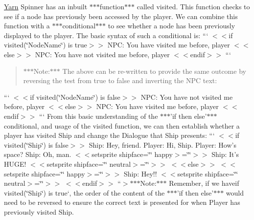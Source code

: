 \hyperlink{a00051}{Yarn} Spinner has an inbuilt $\ast$$\ast$$\ast$function$\ast$$\ast$$\ast$ called {\ttfamily visited}. This function checks to see if a node has previously been accessed by the player. We can combine this function with a $\ast$$\ast$$\ast$conditional$\ast$$\ast$$\ast$ to see whether a node has been previously displayed to the player. The basic syntax of such a conditional is\-: ``` $<$$<$if visited(\char`\"{}\-Node\-Name\char`\"{}) is true$>$$>$ N\-P\-C\-: You have visited me before, player $<$$<$else$>$$>$ N\-P\-C\-: You have not visited me before, player $<$$<$endif$>$$>$ ``` \begin{quotation}
$\ast$$\ast$$\ast$\-Note\-:$\ast$$\ast$$\ast$ The above can be re-\/written to provide the same outcome by reversing the test from true to false and inverting the N\-P\-C text\-:

\end{quotation}
``` $<$$<$if visited(\char`\"{}\-Node\-Name\char`\"{}) is false$>$$>$ N\-P\-C\-: You have not visited me before, player $<$$<$else$>$$>$ N\-P\-C\-: You have visited me before, player $<$$<$endif$>$$>$ ``` From this basic understanding of the $\ast$$\ast$$\ast$'if then else'$\ast$$\ast$$\ast$ conditional, and usage of the {\ttfamily visited} function, we can then establish whether a player has visited Ship and change the Dialogue that Ship presents\-: ``` $<$$<$if visited(\char`\"{}\-Ship\char`\"{}) is false$>$$>$ Ship\-: Hey, friend. Player\-: Hi, Ship. Player\-: How's space? Ship\-: Oh, man. $<$$<$setsprite shipface=\char`\"{}\char`\"{} happy$>$=\char`\"{}\char`\"{}$>$$>$ Ship\-: It's H\-U\-G\-E! $<$$<$setsprite shipface=\char`\"{}\char`\"{} neutral$>$=\char`\"{}\char`\"{}$>$$>$ $<$$<$else$>$$>$ $<$$<$setsprite shipface=\char`\"{}\char`\"{} happy$>$=\char`\"{}\char`\"{}$>$$>$ Ship\-: Hey!! $<$$<$setsprite shipface=\char`\"{}\char`\"{} neutral$>$=\char`\"{}\char`\"{}$>$$>$ $<$$<$endif$>$$>$ ``{\ttfamily  $>$$\ast$$\ast$$\ast$\-Note\-:$\ast$$\ast$$\ast$ Remember, if we have}if visited(\char`\"{}\-Ship\char`\"{}) is true`, the order of the content of the $\ast$$\ast$$\ast$'if then else'$\ast$$\ast$$\ast$ would need to be reversed to ensure the correct text is presented for when Player has previously visited Ship.

